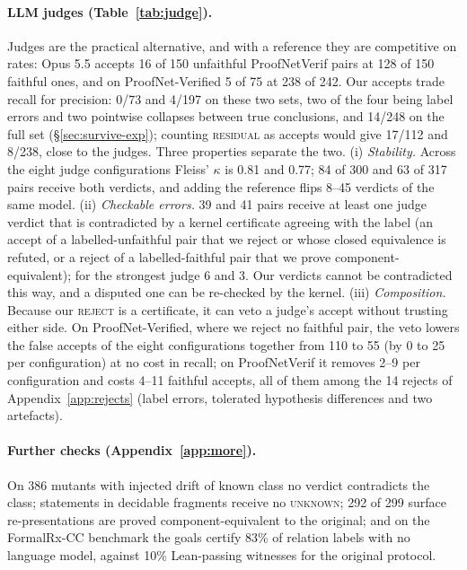 \documentclass[10pt]{article}
\theoremstyle{definition}
\newcommand{\V}[1]{\textsc{#1}}
\begin{document}
\paragraph{LLM judges (Table~\ref{tab:judge}).} Judges are the practical alternative, and
with a reference they are competitive on rates: Opus 5.5 accepts 16 of 150 unfaithful
ProofNetVerif pairs at 128 of 150 faithful ones, and on ProofNet-Verified 5 of 75 at 238 of
242. Our accepts trade recall for precision: 0/73 and 4/197 on these two sets, two of the four
being label errors and two pointwise collapses between true conclusions, and 14/248 on the full
set (\S\ref{sec:survive-exp}); counting \V{residual} as accepts would give 17/112 and 8/238, close
to the judges. Three properties separate the two. (i) \emph{Stability.} Across the eight
judge configurations Fleiss' $\kappa$ is 0.81 and 0.77; 84 of 300 and 63 of 317 pairs receive
both verdicts, and adding the reference flips 8--45 verdicts of the same model. (ii)
\emph{Checkable errors.} 39 and 41 pairs receive at least one judge verdict that is
contradicted by a kernel certificate agreeing with the label (an accept of a labelled-unfaithful
pair that we reject or whose closed equivalence is refuted, or a reject of a labelled-faithful
pair that we prove component-equivalent); for the strongest judge 6 and 3.
Our verdicts cannot be contradicted this way, and a disputed one can be re-checked by the
kernel. (iii) \emph{Composition.} Because our \V{reject} is a certificate, it can veto a
judge's accept without trusting either side. On ProofNet-Verified, where we reject no faithful
pair, the veto lowers the false accepts of the eight configurations together from 110 to 55
(by 0 to 25 per configuration) at no cost in recall; on ProofNetVerif it removes 2--9 per
configuration and costs 4--11 faithful accepts, all of them among the 14 rejects of
Appendix~\ref{app:rejects} (label errors, tolerated hypothesis differences and two artefacts).

\paragraph{Further checks (Appendix~\ref{app:more}).} On 386 mutants with injected drift of
known class no verdict contradicts the class; statements in decidable fragments receive no
\V{unknown}; 292 of 299 surface re-presentations are proved component-equivalent to the original;
and on the FormalRx-CC benchmark the goals certify 83\% of relation labels with no language
model, against 10\% Lean-passing witnesses for the original protocol.
\end{document}
